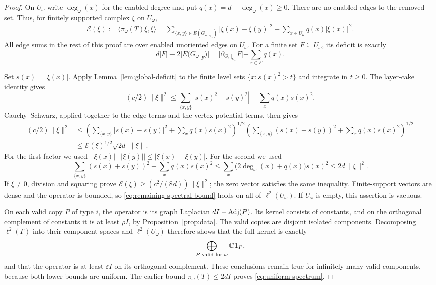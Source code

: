 \begin{proof}
On $U_\omega$ write $\deg_\omega(x)$ for the enabled degree and put
$q(x)=d-\deg_\omega(x)\ge0$.  There are no enabled edges to the removed
set.  Thus, for finitely supported complex $\xi$ on $U_\omega$,
\begin{equation}
 \begin{split}
 \mathcal E(\xi)
 :=\langle\pi_\omega(T)\xi,\xi\rangle
 =\sum_{\{x,y\}\in E(G_\omega|_{U_\omega})}
       |\xi(x)-\xi(y)|^2
   +\sum_{x\in U_\omega}q(x)|\xi(x)|^2.
 \end{split}
 \label{eq:remaining-energy}
\end{equation}
All edge sums in the rest of this proof are over enabled unoriented
edges on $U_\omega$.  For a finite set $F\subseteq U_\omega$, its
deficit is exactly
\[
 d|F|-2|E(G_\omega|_F)|
 =|\partial_{G_\omega|_{U_\omega}}F|+\sum_{x\in F}q(x).
\]

Set $s(x)=|\xi(x)|$.  Apply Lemma~\ref{lem:global-deficit} to the finite
level sets $\{x:s(x)^2>t\}$ and integrate in $t\ge0$.  The layer-cake
identity gives
\[
 (c/2)\|\xi\|^2
 \le\sum_{\{x,y\}}|s(x)^2-s(y)^2|+\sum_xq(x)s(x)^2.
\]
Cauchy--Schwarz, applied together to the edge terms and the
vertex-potential terms, then gives
\begin{align*}
 (c/2)\|\xi\|^2
 &\le
 \left(\sum_{\{x,y\}}|s(x)-s(y)|^2+\sum_xq(x)s(x)^2\right)^{1/2}
 \left(\sum_{\{x,y\}}(s(x)+s(y))^2+\sum_xq(x)s(x)^2\right)^{1/2}\\
 &\le\mathcal E(\xi)^{1/2}\sqrt{2d}\,\|\xi\|.
\end{align*}
For the first factor we used
$||\xi(x)|-|\xi(y)||\le|\xi(x)-\xi(y)|$.  For the second we used
\[
 \sum_{\{x,y\}}(s(x)+s(y))^2+\sum_xq(x)s(x)^2
 \le\sum_x\bigl(2\deg_\omega(x)+q(x)\bigr)s(x)^2
 \le2d\|\xi\|^2.
\]
If $\xi\ne0$, division and squaring prove
$\mathcal E(\xi)\ge(c^2/(8d))\|\xi\|^2$; the zero vector satisfies
the same inequality.  Finite-support vectors are dense and the operator
is bounded, so \eqref{eq:remaining-spectral-bound} holds on all of
$\ell^2(U_\omega)$.  If $U_\omega$ is empty, this assertion is vacuous.

On each valid copy $P$ of type $i$, the operator is its graph Laplacian
$dI-\operatorname{Adj}(P)$.  Its kernel consists of constants, and on the orthogonal
complement of constants it is at least $\rho I$, by
Proposition~\ref{prop:data}.  The valid copies are disjoint isolated
components.  Decomposing $\ell^2(\Gamma)$ into their component spaces
and $\ell^2(U_\omega)$ therefore shows that the full kernel is exactly
\[
 \bigoplus_{P\text{ valid for }\omega}\mathbb C\mathbf 1_P,
\]
and that the operator is at least $\varepsilon I$ on its orthogonal
complement.  These conclusions remain true for infinitely many valid
components, because both lower bounds are uniform.  The earlier bound
$\pi_\omega(T)\le2dI$ proves \eqref{eq:uniform-spectrum}.
\end{proof}

